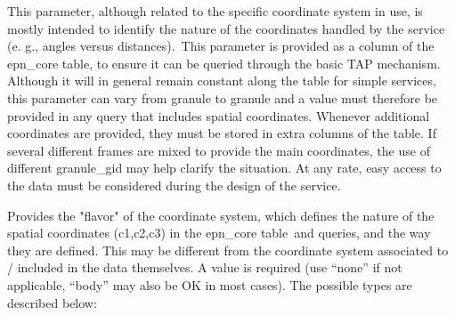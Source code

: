 \documentclass[11pt,a4paper]{ivoa}
\begin{document}
This parameter, although related to the specific coordinate system in use, is mostly intended to identify the nature of the coordinates handled by the service (e. g., angles versus distances). This parameter is provided as a column of the epn\_core table, to ensure it can be queried through the basic TAP mechanism. Although it will in general remain constant along the table for simple services, this parameter can vary from granule to granule and a value must therefore be provided in any query that includes spatial coordinates. Whenever additional coordinates are provided, they must be stored in extra columns of the table. If several different frames are mixed to provide the main coordinates, the use of different granule\_gid may help clarify the situation. At any rate, easy access to the data must be considered during the design of the service. 

Provides the "flavor" of the coordinate system, which defines the nature of the spatial coordinates (c1,c2,c3) in the epn\_core table and queries, and the way they are defined. This may be different from the coordinate system associated to / included in the data themselves. A value is required (use ``none'' if not applicable, ``body'' may also be OK in most cases). The possible types are described below:
\end{document}
